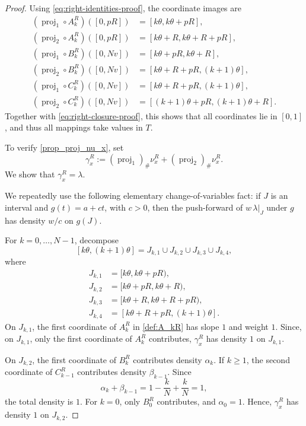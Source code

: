 \documentclass{article}
\newcommand{\lam}{\lambda}
\begin{document}
\begin{proof}
Using \eqref{eq:right-identities-proof}, the coordinate images are
\[
\begin{aligned}
    (\operatorname{proj}_1\circ A_k^R)([0,pR])
    &=[k\theta,k\theta+pR],\\
    (\operatorname{proj}_2\circ A_k^R)([0,pR])
    &=[k\theta+R,k\theta+R+pR],\\
    (\operatorname{proj}_1\circ B_k^R)([0,Nv])
    &=[k\theta+pR,k\theta+R],\\
    (\operatorname{proj}_2\circ B_k^R)([0,Nv])
    &=[k\theta+R+pR,(k+1)\theta],\\
    (\operatorname{proj}_1\circ C_k^R)([0,Nv])
    &=[k\theta+R+pR,(k+1)\theta],\\
    (\operatorname{proj}_2\circ C_k^R)([0,Nv])
    &=[(k+1)\theta+pR,(k+1)\theta+R].
\end{aligned}
\]
Together with \eqref{eq:right-closure-proof}, this shows that all coordinates lie in \([0,1]\), and thus all mappings take values in \(T\).

To verify \eqref{prop_proj_nu_x}, set
\[
    \gamma_x^R
    :=
    (\operatorname{proj}_1)_\#\nu_x^R
    +
    (\operatorname{proj}_2)_\#\nu_x^R.
\]
We show that \(\gamma_x^R=\lam\).

We repeatedly use the following elementary change-of-variables fact: if \(J\) is an interval and \(g(t)=a+ct\), with \(c>0\), then the push-forward of \(w\,\lam\vert_J\) under \(g\) has density \(w/c\) on \(g(J)\).

For \(k=0,\ldots,N-1\), decompose
\[
    [k\theta,(k+1)\theta]
    =
    J_{k,1}\cup J_{k,2}\cup J_{k,3}\cup J_{k,4},
\]
where
\begin{align*}
    J_{k,1}&=[k\theta,k\theta+pR),\\
    J_{k,2}&=[k\theta+pR,k\theta+R),\\
    J_{k,3}&=[k\theta+R,k\theta+R+pR),\\
    J_{k,4}&=[k\theta+R+pR,(k+1)\theta].
\end{align*}
On \(J_{k,1}\), the first coordinate of \(A_k^R\) in \eqref{def:A_kR} has slope \(1\) and weight \(1\).
Since, on \(J_{k,1}\), only the first coordinate of \(A_k^R\) contributes,  \(\gamma_x^R\) has density \(1\) on \(J_{k,1}\).

On \(J_{k,2}\), the first coordinate of \(B_k^R\) contributes density \(\alpha_k\).
If \(k\geq1\), the second coordinate of \(C_{k-1}^R\) contributes density \(\beta_{k-1}\).
Since
\[
    \alpha_k+\beta_{k-1}
    =
    1-\frac{k}{N}+\frac{k}{N}
    =1,
\]
the total density is \(1\).
For \(k=0\), only \(B_0^R\) contributes, and \(\alpha_0=1\).
Hence, \(\gamma_x^R\) has density \(1\) on \(J_{k,2}\).


\end{proof}
\end{document}
